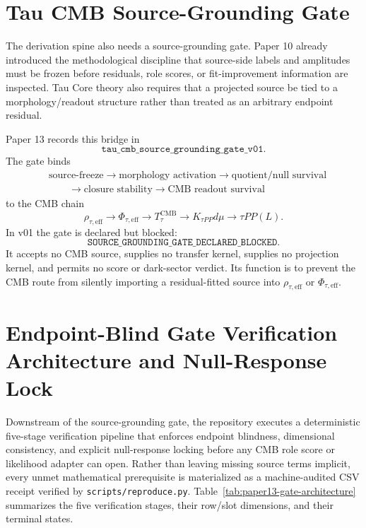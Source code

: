 \documentclass[11pt]{article}
\begin{document}
\section{Tau CMB Source-Grounding Gate}

The derivation spine also needs a source-grounding gate. Paper 10 already
introduced the methodological discipline that source-side labels and amplitudes
must be frozen before residuals, role scores, or fit-improvement information
are inspected. Tau Core theory also requires that a projected source be tied to
a morphology/readout structure rather than treated as an arbitrary endpoint
residual.

Paper 13 records this bridge in
\[
\texttt{tau\_cmb\_source\_grounding\_gate\_v01}.
\]
The gate binds
\[
\begin{aligned}
&\text{source-freeze}
\rightarrow
\text{morphology activation}
\rightarrow
\text{quotient/null survival}\\
&\qquad\rightarrow
\text{closure stability}
\rightarrow
\text{CMB readout survival}
\end{aligned}
\]
to the CMB chain
\[
\rho_{\tau,\mathrm{eff}}
\rightarrow
\Phi_{\tau,\mathrm{eff}}
\rightarrow
T_{\tau}^{\mathrm{CMB}}
\rightarrow
K_{\tau PP}d\mu
\rightarrow
\tau PP(L).
\]
In v01 the gate is declared but blocked:
\[
\texttt{SOURCE\_GROUNDING\_GATE\_DECLARED\_BLOCKED}.
\]
It accepts no CMB source, supplies no transfer kernel, supplies no projection
kernel, and permits no score or dark-sector verdict. Its function is to prevent
the CMB route from silently importing a residual-fitted source into
\(\rho_{\tau,\mathrm{eff}}\) or \(\Phi_{\tau,\mathrm{eff}}\).

\section{Endpoint-Blind Gate Verification Architecture and Null-Response Lock}
\label{sec:gate-verification-summary}

Downstream of the source-grounding gate, the repository executes a deterministic
five-stage verification pipeline that enforces endpoint blindness, dimensional
consistency, and explicit null-response locking before any CMB role score or
likelihood adapter can open. Rather than leaving missing source terms implicit,
every unmet mathematical prerequisite is materialized as a machine-audited CSV
receipt verified by \texttt{scripts/reproduce.py}.
Table~\ref{tab:paper13-gate-architecture} summarizes the five verification
stages, their row/slot dimensions, and their terminal states.
\end{document}
